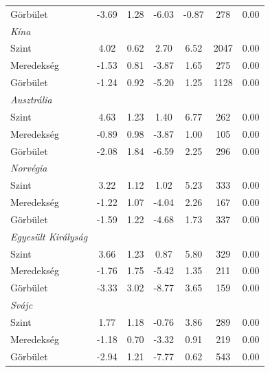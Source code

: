\documentclass[12pt,bibliography=totoc]{article}
\begin{document}
\begin{table}[H]
\begin{tabular}{l c c c c c c}
\medskip													
Görbület					&	-3.69	&	1.28	&	-6.03	&	-0.87	&	278	&	0.00	\\
\textit{Kína}				&		&		&		&		&		&		\\
Szint						&	4.02	&	0.62	&	2.70	&	6.52 &	2047	&	0.00	\\
Meredekség				&	-1.53	&	0.81	&	-3.87	&	1.65 &	275	&	0.00	\\
\medskip													
Görbület					&	-1.24	&	0.92	&	-5.20	&	1.25&	1128	&	0.00	\\
\textit{Ausztrália}			&		&		&		&		&		&		\\
Szint						&	4.63	&	1.23	&	1.40	&	6.77	&	262	&	0.00	\\
Meredekség				&	-0.89	&	0.98	&	-3.87	&	1.00	&	105	&	0.00	\\
\medskip													
Görbület					&	-2.08	&	1.84	&	-6.59	&	2.25	&	296	&	0.00	\\
\textit{Norvégia}				&		&		&		&		&		&		\\
Szint						&	3.22	&	1.12	&	1.02	&	5.23	&	333	&	0.00	\\
Meredekség				&	-1.22	&	1.07	&	-4.04	&	2.26	&	167	&	0.00	\\
\medskip													
Görbület					&	-1.59	&	1.22	&	-4.68	&	1.73	&	337	&	0.00	\\
\textit{Egyesült Királyság}		&		&		&		&		&		&		\\
Szint						&	3.66	&	1.23	&	0.87	&	5.80	&	329	&	0.00	\\
Meredekség				&	-1.76	&	1.75	&	-5.42	&	1.35	&	211	&	0.00	\\
\medskip													
Görbület					&	-3.33	&	3.02	&	-8.77	&	3.65	&	159	&	0.00	\\
\textit{Svájc}				&		&		&		&		&		&		\\
Szint						&	1.77	&	1.18	&	-0.76	&	3.86	&	289	&	0.00	\\
Meredekség				&	-1.18	&	0.70	&	-3.32	&	0.91	&	219	&	0.00	\\
Görbület					&	-2.94	&	1.21	&	-7.77	&	0.62	&	543	&	0.00	\\

\hline%
\end{tabular}
\label{table:nonlin}%
\end{table}

\end{document}
